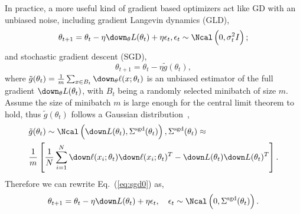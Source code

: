 \documentclass{article}
\begin{document}
In practice, a more useful kind of gradient based optimizers act like GD with an unbiased noise, including gradient Langevin dynamics (GLD),
\begin{equation}
    \theta_{t+1} = \theta_t - \eta \down_{\theta}L(\theta_t) + \eta \epsilon_t, \epsilon_t \sim \Ncal \left(0, \sigma_t^2 I\right);
    \label{eq:gld}
\end{equation}
and stochastic gradient descent (SGD),
\begin{equation}
    \theta_{t+1} = \theta_t - \eta \tilde{g}(\theta_t),
    \label{eq:sgd0}
\end{equation}
where $\tilde{g}(\theta_t) = \frac{1}{m}\sum_{x \in B_t} \down_{\theta} \ell(x; \theta_t)$ is an unbiased estimator of the full gradient $\down_{\theta} L (\theta_t)$, with $B_t$ being a randomly selected minibatch of size $m$.
Assume the size of minibatch $m$ is large enough for the central limit theorem to hold, thus $\tilde{g}(\theta_t)$ follows a Gaussian distribution~\cite{chen2014stochastic,ahn2012bayesian,shang2015covariance,mandt2017stochastic},
\begin{equation}
    \begin{aligned}
        &\tilde{g} (\theta_t) \sim \Ncal \left(\down L(\theta_t), \Sigma^{\text{sgd}} (\theta_t) \right), \Sigma^{\text{sgd}}(\theta_t) \approx \\
        &\frac{1}{m} \left[\frac{1}{N}\sum_{i=1}^N\down\ell(x_i;\theta_t)\down\ell(x_i;\theta_t)^T - \down L(\theta_t) \down L(\theta_t)^T \right].
    \end{aligned}
    \label{eq:sgdcov}
\end{equation}
Therefore we can rewrite Eq.~(\ref{eq:sgd0}) as, 
\begin{equation}
    \theta_{t+1} = \theta_t - \eta \down L(\theta_t) + \eta \epsilon_t, \quad \epsilon_t \sim \Ncal \left(0, \Sigma^{\text{sgd}}(\theta_t) \right).
    \label{eq:sgd}
\end{equation}
\end{document}

